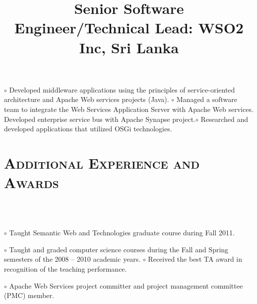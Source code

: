 \begin{resume}
\title{\textbf{Senior Software Engineer/Technical Lead: WSO2 Inc, Sri Lanka}}
\begin{position}
$\circ$ Developed middleware applications using the principles of service-oriented 
architecture and Apache Web services projects (Java).   \newline $\circ$ 
Managed a software team to integrate the Web Services Application Server with Apache Web services. 
Developed enterprise service bus with Apache Synapse project.\newline $\circ$ Researched and 
developed 
applications that utilized OSGi technologies. 
\end{position}

\vspace{-2mm}
\section{\textsc{Additional Experience and Awards}}

\begin{formatb}
  \\
  \body\\
\end{formatb}

\begin{position}
$\circ$  Taught Semantic Web and Technologies graduate course during Fall 2011.  
\end{position}

\begin{position}
$\circ$  Taught and graded computer science courses during the Fall and Spring
semesters of the 2008 -- 2010 academic years. \newline $\circ$   Received the best TA award in 
recognition of the teaching
performance.
\end{position}


\begin{position}
$\circ$  Apache Web Services project committer  and project management committee (PMC)  member.
\end{position}



\end{resume}
